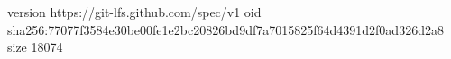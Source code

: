 version https://git-lfs.github.com/spec/v1
oid sha256:77077f3584e30be00fe1e2bc20826bd9df7a7015825f64d4391d2f0ad326d2a8
size 18074
